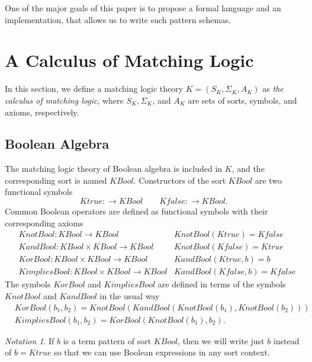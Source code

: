 \documentclass[UTF8]{article}
\newcounter{thmcounter}
\theoremstyle{plain}
\theoremstyle{definition}
\theoremstyle{remark}
\newtheorem{notation}[thmcounter]{Notation}
\newcommand{\KBool}{\mathit{KBool}}
\newcommand{\Ktrue}{\mathit{Ktrue}}
\newcommand{\Kfalse}{\mathit{Kfalse}}
\newcommand{\KandBool}{\mathit{KandBool}}
\newcommand{\KorBool}{\mathit{KorBool}}
\newcommand{\KnotBool}{\mathit{KnotBool}}
\newcommand{\KimpliesBool}{\mathit{KimpliesBool}}
\begin{document}
One of the major goals of this paper is to propose a formal language
and an implementation, that allows us to write such pattern schemas.

\section{A Calculus of Matching Logic}

In this section, we define a matching logic theory $K = (S_K, \Sigma_K, A_K)$ 
as \emph{the calculus of matching logic},
where $S_K, \Sigma_K$, and $A_K$ are sets of sorts, symbols, and axioms, 
respectively.

\subsection{Boolean Algebra}

The matching logic theory of Boolean algebra is included in $K$,
and the corresponding sort is named $\KBool$.
Constructors of the sort $\KBool$ are two functional symbols
\begin{equation*}
\Ktrue \colon \to \KBool \qquad \Kfalse \colon \to \KBool.
\end{equation*}
Common Boolean operators are defined as functional symbols with their
corresponding axioms
\begin{align*}
&\KnotBool \colon \KBool \to \KBool
&\KnotBool(\Ktrue) = \Kfalse
\\
&\KandBool \colon \KBool \times \KBool \to \KBool
&\KnotBool(\Kfalse) = \Ktrue
\\
&\KorBool \colon \KBool \times \KBool \to \KBool
&\KandBool(\Ktrue, b) = b
\\
&\KimpliesBool \colon \KBool \times \KBool \to \KBool
&\KandBool(\Kfalse, b) = \Kfalse
\end{align*}
The symbols $\KorBool$ and $\KimpliesBool$ are defined in terms of the symbols
$\KnotBool$ and $\KandBool$ in the usual way
\begin{align*}
&\KorBool(b_1, b_2) = \KnotBool(\KandBool(\KnotBool(b_1), \KnotBool(b_2)))
\\
&\KimpliesBool(b_1, b_2) = \KorBool(\KnotBool(b_1), b_2).
\end{align*}

\begin{notation}
	If $b$ is a term pattern of sort $\KBool$, then we will write just $b$ instead of $b = \Ktrue$ so that we can use Boolean expressions in any sort context.
\end{notation}
\end{document}
